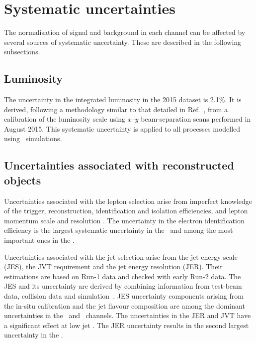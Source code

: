 \section{Systematic uncertainties}
\label{s:systematics}

The normalisation of signal and background in each channel can be affected by
several sources of systematic uncertainty. These are described in the
following subsections.

\subsection{Luminosity}
\label{sec:syst_lumi}
The uncertainty in the integrated luminosity in the 2015 dataset is 2.1\%. It is
derived, following a methodology similar to that detailed in
Ref.~\cite{DAPR-2011-01}, from a calibration of the luminosity
scale using $x$--$y$ beam-separation scans performed in August 2015. This
systematic uncertainty is applied to all processes modelled using \MC\
simulations.

\subsection{Uncertainties associated with reconstructed objects}
\label{sec:syst_objects}
 
Uncertainties associated with the lepton selection arise from imperfect
knowledge of the trigger, reconstruction, identification and isolation
efficiencies, and lepton momentum scale and resolution \cite{PERF-2013-03,
ATL-PHYS-PUB-2011-006, ATLAS-CONF-2014-032, ATL-PHYS-PUB-2015-041,
PERF-2015-10}.  The uncertainty in the electron identification
efficiency is the largest systematic uncertainty in the \TLC\ and among the
most important ones in the \FLC.    

Uncertainties associated with the jet selection arise from the jet energy scale
(JES), the JVT requirement and the jet energy resolution (JER).
Their estimations are based on Run-1 data and checked with early
Run-2 data.  The JES and its uncertainty are derived by combining information from
test-beam data, collision data and simulation~\cite{PERF-2012-01}.  JES
uncertainty components arising from the in-situ calibration and the jet flavour
composition are among the dominant uncertainties in the \SSLSR\ and \TL\
channels.  The uncertainties in the JER and JVT have a significant effect at
low jet \pt.  The JER uncertainty results in the second largest uncertainty in the
\TLC.

